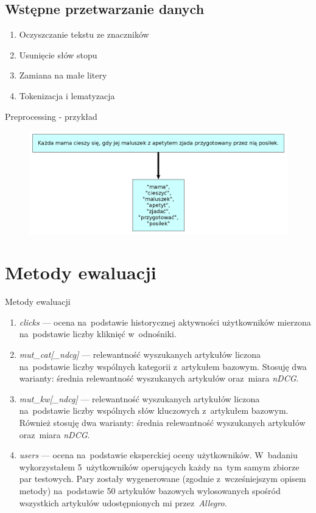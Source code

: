\documentclass{beamer}
\begin{document}
	\subsection{Wstępne przetwarzanie danych}
	\begin{frame}
		\begin{enumerate}
			\item Oczyszczanie tekstu ze znaczników
			\item Usunięcie słów stopu \pause
			\item Zamiana na małe litery \pause
			\item Tokenizacja i lematyzacja %
		\end{enumerate}
	\end{frame}
	\begin{frame}{Preprocessing - przykład}
		\begin{figure}
			\centering
			\includegraphics[width=1\textwidth]{img/lemmatisation.png}
		\end{figure}
	\end{frame}
	\section{Metody ewaluacji}
	\begin{frame}{Metody ewaluacji}
		\begin{enumerate}
			\item \textit{clicks} --- ocena na~podstawie historycznej aktywności użytkowników mierzona na~podstawie liczby kliknięć w~odnośniki.
			\item \textit{mut\_cat[\_ndcg]} --- relewantność wyszukanych artykułów liczona na~podstawie liczby wspólnych kategorii z~artykułem bazowym. Stosuję dwa warianty: średnia relewantność wyszukanych artykułów oraz~miara \textit{nDCG}.
			\item \textit{mut\_kw[\_ndcg]} --- relewantność wyszukanych artykułów liczona na~podstawie liczby wspólnych słów kluczowych z~artykułem bazowym. Również stosuję dwa warianty: średnia relewantność wyszukanych artykułów oraz~miara \textit{nDCG}.
			\item \textit{users} --- ocena na~podstawie eksperckiej oceny użytkowników. W~badaniu wykorzystałem 5~użytkowników operujących każdy na~tym samym zbiorze par testowych. Pary zostały wygenerowane (zgodnie z~wcześniejszym opisem metody) na~podstawie 50 artykułów bazowych wylosowanych spośród wszystkich artykułów udostępnionych mi przez~\textit{Allegro}.
		\end{enumerate}
	\end{frame}
\end{document}

